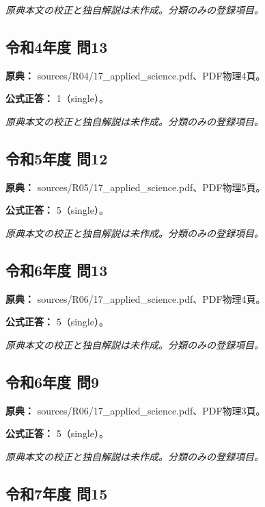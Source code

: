 \par\textit{原典本文の校正と独自解説は未作成。分類のみの登録項目。}

\subsection{令和4年度 問13}
\label{q:r04-reg-applied-13}

\noindent\textbf{原典：} sources/R04/17\_applied\_science.pdf、PDF物理4頁。

\textbf{公式正答：} 1（single）。

\par\textit{原典本文の校正と独自解説は未作成。分類のみの登録項目。}

\subsection{令和5年度 問12}
\label{q:r05-reg-applied-12}

\noindent\textbf{原典：} sources/R05/17\_applied\_science.pdf、PDF物理5頁。

\textbf{公式正答：} 5（single）。

\par\textit{原典本文の校正と独自解説は未作成。分類のみの登録項目。}

\subsection{令和6年度 問13}
\label{q:r06-reg-applied-13}

\noindent\textbf{原典：} sources/R06/17\_applied\_science.pdf、PDF物理4頁。

\textbf{公式正答：} 5（single）。

\par\textit{原典本文の校正と独自解説は未作成。分類のみの登録項目。}

\subsection{令和6年度 問9}
\label{q:r06-reg-applied-09}

\noindent\textbf{原典：} sources/R06/17\_applied\_science.pdf、PDF物理3頁。

\textbf{公式正答：} 5（single）。

\par\textit{原典本文の校正と独自解説は未作成。分類のみの登録項目。}

\subsection{令和7年度 問15}
\label{q:r07-reg-applied-15}

